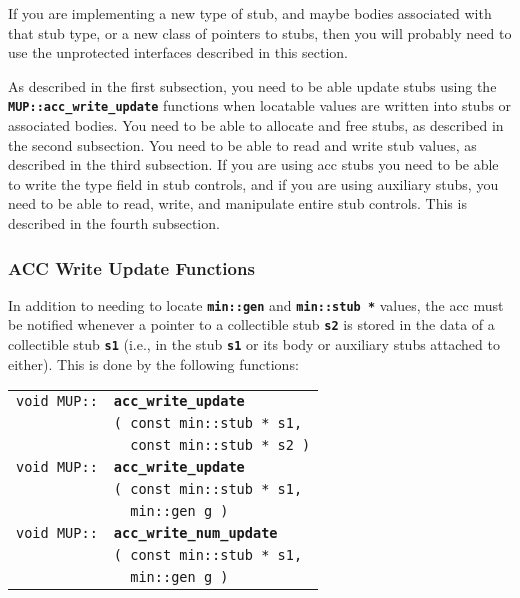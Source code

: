 \documentclass[12pt]{article}
\makeatletter
\newcommand{\TT}[1]{{\tt \bfseries #1}}
\newcommand{\ttindex}[1]{\index{#1@{\tt #1}}}
\newcommand{\EOL}{\penalty \exhyphenpenalty}
\newenvironment{indpar}[1][0.3in]%
	{\begin{list}{}%
		     {\setlength{\itemsep}{0in}%
		      \setlength{\topsep}{0in}%
		      \setlength{\parsep}{1ex}%
		      \setlength{\labelwidth}{#1}%
		      \setlength{\leftmargin}{#1}%
		      \addtolength{\leftmargin}{\labelsep}}%
	 \item}%
	{\end{list}}
\newcommand{\LABEL}[1]{\label{#1}}
\newlength{\ARGBREAKLENGTH}
\newcommand{\ARGBREAK}[1][\ARGBREAKLENGTH]{\\&\hspace*{#1}}
\newcommand{\MUPKEY}[1]%
	   {\TT{#1}\ttindex{MUP::#1}\ttindex{#1}}
\makeatother
\begin{document}
If you are implementing a new type of stub, and maybe bodies
associated with that stub type, or a new class of pointers to stubs,
then you will probably need to use the unprotected
interfaces described in this section.

As described in the first subsection, you need to be able update stubs
using the \TT{MUP::\EOL acc\_\EOL write\_\EOL update} functions
when locatable values are written into stubs or associated bodies.
You need to be able to allocate and free stubs, as described in the
second subsection.  You need to be able to read and write stub values,
as described in the third subsection.  If you are using acc stubs you
need to be able to write the type field in stub controls, and if
you are using auxiliary stubs, you need to be able to read, write,
and manipulate entire stub controls.
This is described in the fourth subsection.

\subsubsection{ACC Write Update Functions}
\label{ACC-WRITE-UPDATE-FUNCTIONS}

In addition to needing to locate \TT{min::gen}
and \TT{min::\EOL stub~*} values, the acc
must be notified whenever a pointer to a collectible stub \TT{s2}
is stored in the data of a collectible stub \TT{s1} (i.e., in
the stub \TT{s1} or its body or auxiliary stubs attached to either).
This is done by the following functions:

\begin{indpar}\begin{tabular}{r@{}l}
\verb|void MUP::|
    & \MUPKEY{acc\_write\_update}\ARGBREAK
          \verb|( const min::stub * s1,|\ARGBREAK
	  \verb|  const min::stub * s2 )|
\LABEL{MUP::ACC_WRITE_STUB_UPDATE} \\
\verb|void MUP::|
    & \MUPKEY{acc\_write\_update}\ARGBREAK
          \verb|( const min::stub * s1,|\ARGBREAK
	  \verb|  min::gen g )|
\LABEL{MUP::ACC_WRITE_GEN_UPDATE} \\
\verb|void MUP::|
    & \MUPKEY{acc\_write\_num\_update}\ARGBREAK
          \verb|( const min::stub * s1,|\ARGBREAK
	  \verb|  min::gen g )|
\LABEL{MUP::ACC_WRITE_NUM_GEN_UPDATE} \\
\end{tabular}\end{indpar}
\end{document}
